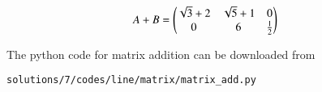 \begin{align}
A+B &= \begin{pmatrix}\sqrt{3}+2&\sqrt{5}+1&0\\0&6&\frac{1}{2}\end{pmatrix}
\end{align}

 The python code for matrix addition can be downloaded from
\begin{lstlisting}
solutions/7/codes/line/matrix/matrix_add.py
\end{lstlisting}

